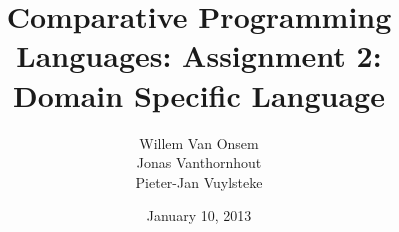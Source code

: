 \documentclass[titlepage]{article}
\title{Comparative Programming Languages: Assignment 2:\\Domain Specific
Language}
\author{Willem Van Onsem\\Jonas Vanthornhout\\Pieter-Jan Vuylsteke}
\date{January 10, 2013}
\begin{document}
\begin{titlepage}
\maketitle
\end{titlepage}
\tableofcontents






\end{document}

